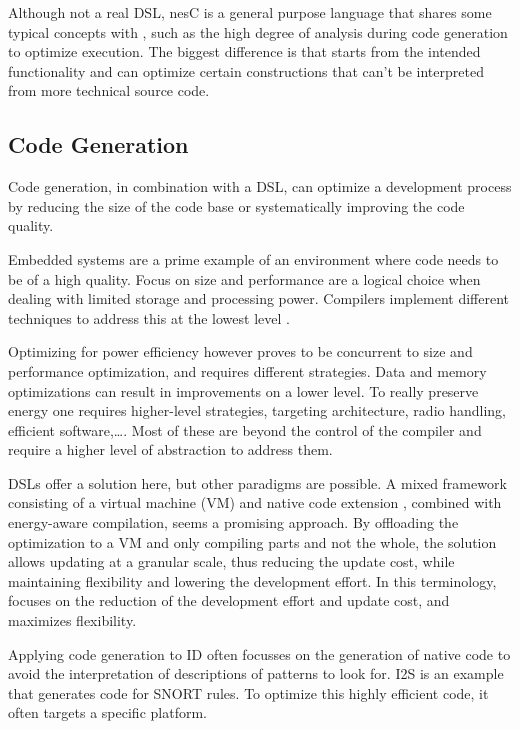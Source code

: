 \documentclass[3p,times,procedia]{elsarticle}
\begin{document}
Although not a real DSL, nesC \cite{gay2003nesc} is a general purpose language
that shares some typical concepts with \NAME, such as the high degree of
analysis during code generation to optimize execution. The biggest difference
is that \NAME starts from the intended functionality and can optimize certain
constructions that can't be interpreted from more technical source code.

\subsection{Code Generation}

Code generation, in combination with a DSL, can optimize a development process
by reducing the size of the code base or systematically improving the code
quality.

Embedded systems are a prime example of an environment where code needs to be
of a high quality. Focus on size and performance are a logical choice when
dealing with limited storage and processing power. Compilers implement
different techniques to address this at the lowest level
\cite{marwedel2002code}.

Optimizing for power efficiency however proves to be concurrent to size and
performance optimization, and requires different strategies. Data and memory
optimizations \cite{panda2001data} can result in improvements on a lower level.
To really preserve energy one requires higher-level strategies, targeting
architecture, radio handling, efficient software,\dots \cite{naik2001software}.
Most of these are beyond the control of the compiler and require a higher level
of abstraction to address them.

DSLs offer a solution here, but other paradigms are possible. A mixed framework
consisting of a virtual machine (VM) and native code extension
\cite{sadilek2007energy}, combined with energy-aware compilation, seems a
promising approach. By offloading the optimization to a VM and only compiling
parts and not the whole, the solution allows updating at a granular scale, thus
reducing the update cost, while maintaining flexibility and lowering the
development effort. In this terminology, \NAME focuses on the reduction of the
development effort and update cost, and maximizes flexibility.

Applying code generation to ID often focusses on the generation of native code
to avoid the interpretation of descriptions of patterns to look for. I2S
\cite{charitakis2003code} is an example that generates code for SNORT
\cite{roesch1999snort} rules. To optimize this highly efficient code, it often
targets a specific platform.
\end{document}
